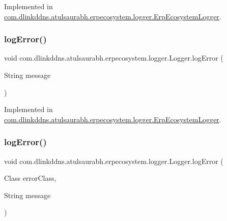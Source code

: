 Implemented in \mbox{\hyperlink{classcom_1_1dlinkddns_1_1atulsaurabh_1_1erpecosystem_1_1logger_1_1_erp_ecosystem_logger_a40e19afc6e72a31339e4eec00132c166}{com.\+dlinkddns.\+atulsaurabh.\+erpecosystem.\+logger.\+Erp\+Ecosystem\+Logger}}.

\mbox{\label{interfacecom_1_1dlinkddns_1_1atulsaurabh_1_1erpecosystem_1_1logger_1_1_logger_a0a9d496d0bbbd0afd87f13d38acb88e2}} 
\subsubsection{\texorpdfstring{log\+Error()}{logError()}\hspace{0.1cm}{\footnotesize\ttfamily [1/3]}}
{\footnotesize\ttfamily void com.\+dlinkddns.\+atulsaurabh.\+erpecosystem.\+logger.\+Logger.\+log\+Error (\begin{DoxyParamCaption}\item[{String}]{message }\end{DoxyParamCaption})}



Implemented in \mbox{\hyperlink{classcom_1_1dlinkddns_1_1atulsaurabh_1_1erpecosystem_1_1logger_1_1_erp_ecosystem_logger_ab9553bd3b9e717accdc9c2d0ee13371e}{com.\+dlinkddns.\+atulsaurabh.\+erpecosystem.\+logger.\+Erp\+Ecosystem\+Logger}}.

\mbox{\label{interfacecom_1_1dlinkddns_1_1atulsaurabh_1_1erpecosystem_1_1logger_1_1_logger_a1cf0d549875c44c1afd8cd01dc0af1d6}} 
\subsubsection{\texorpdfstring{log\+Error()}{logError()}\hspace{0.1cm}{\footnotesize\ttfamily [2/3]}}
{\footnotesize\ttfamily void com.\+dlinkddns.\+atulsaurabh.\+erpecosystem.\+logger.\+Logger.\+log\+Error (\begin{DoxyParamCaption}\item[{Class}]{error\+Class,  }\item[{String}]{message }\end{DoxyParamCaption})}



